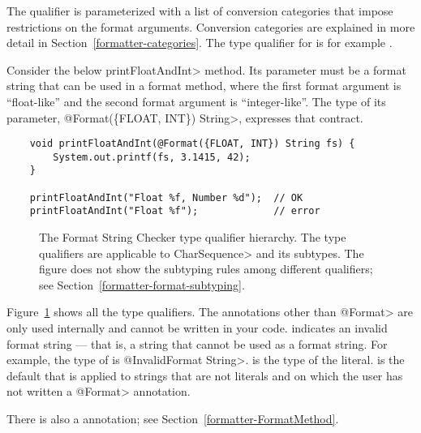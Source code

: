 The  qualifier is parameterized with
a list of conversion categories that impose restrictions on the format arguments.
Conversion categories are explained in more detail in
Section~\ref{formatter-categories}.  The type qualifier for  is
for example .

Consider the below \<printFloatAndInt> method.  Its parameter must be a
format string that can be used in a format method, where the first format
argument is ``float-like'' and the second format argument is
``integer-like''.  The type of its parameter, \<@Format(\{FLOAT, INT\})
String>, expresses that contract.

\begin{Verbatim}
    void printFloatAndInt(@Format({FLOAT, INT}) String fs) {
        System.out.printf(fs, 3.1415, 42);
    }

    printFloatAndInt("Float %f, Number %d");  // OK
    printFloatAndInt("Float %f");             // error
\end{Verbatim}

\begin{figure}
\caption{The
  Format String Checker type qualifier hierarchy.
  The type qualifiers are applicable to \<CharSequence> and its subtypes.
  The figure does not show the subtyping rules among different
  qualifiers; see
  Section~\ref{formatter-format-subtyping}.
}
\label{fig-formatter-hierarchy}
\end{figure}

Figure~\ref{fig-formatter-hierarchy} shows all the type qualifiers.
The annotations other than \<@Format> are only used
internally and cannot be written in your code.
 indicates an invalid format
string --- that is, a string that cannot be used as a format string.  For
example, the type of  is \<@InvalidFormat String>.
 is the type of the
 literal.
 is the default that is
applied to strings that are not literals and on which the user has not
written a \<@Format> annotation.

There is also a 
annotation; see Section~\ref{formatter-FormatMethod}.




